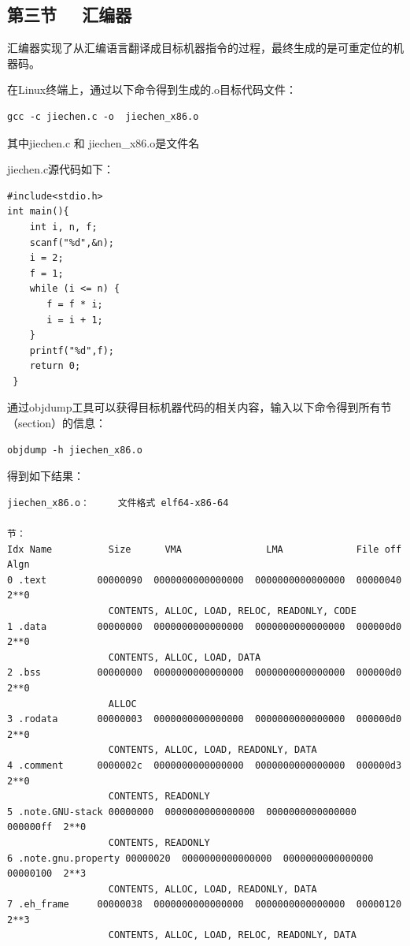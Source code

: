 \documentclass[UTF8,a4paper,10pt]{ctexart}
\begin{document}
\subsection{第三节 \ \ 汇编器}
汇编器实现了从汇编语言翻译成目标机器指令的过程，最终生成的是可重定位的机器码。\par
在Linux终端上，通过以下命令得到生成的.o目标代码文件：
\begin{lstlisting}[frame=trbl]
  gcc -c jiechen.c -o  jiechen_x86.o
\end{lstlisting}\par
其中jiechen.c 和 jiechen\_x86.o是文件名\par
jiechen.c源代码如下：
\begin{lstlisting}[frame=trbl]
#include<stdio.h>
int main(){
    int i, n, f;
    scanf("%d",&n);
    i = 2;
    f = 1;
    while (i <= n) {
       f = f * i;
       i = i + 1;
    }
    printf("%d",f);
    return 0;
 }
\end{lstlisting}\par
通过objdump工具可以获得目标机器代码的相关内容，输入以下命令得到所有节（section）的信息：
\begin{lstlisting}[frame=trbl]
  objdump -h jiechen_x86.o
\end{lstlisting}\par
得到如下结果：
\begin{lstlisting}[frame=trbl]
  jiechen_x86.o：     文件格式 elf64-x86-64

节：
Idx Name          Size      VMA               LMA             File off  Algn
0 .text         00000090  0000000000000000  0000000000000000  00000040  2**0
                  CONTENTS, ALLOC, LOAD, RELOC, READONLY, CODE
1 .data         00000000  0000000000000000  0000000000000000  000000d0  2**0
                  CONTENTS, ALLOC, LOAD, DATA
2 .bss          00000000  0000000000000000  0000000000000000  000000d0  2**0
                  ALLOC
3 .rodata       00000003  0000000000000000  0000000000000000  000000d0  2**0
                  CONTENTS, ALLOC, LOAD, READONLY, DATA
4 .comment      0000002c  0000000000000000  0000000000000000  000000d3  2**0
                  CONTENTS, READONLY
5 .note.GNU-stack 00000000  0000000000000000  0000000000000000  000000ff  2**0
                  CONTENTS, READONLY
6 .note.gnu.property 00000020  0000000000000000  0000000000000000  00000100  2**3
                  CONTENTS, ALLOC, LOAD, READONLY, DATA
7 .eh_frame     00000038  0000000000000000  0000000000000000  00000120  2**3
                  CONTENTS, ALLOC, LOAD, RELOC, READONLY, DATA
\end{lstlisting}\par
\end{document}
